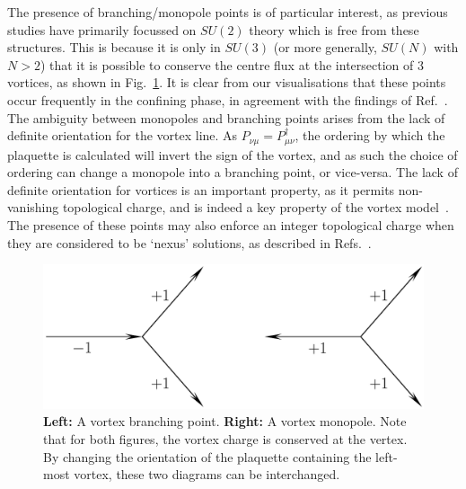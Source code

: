 The presence of branching/monopole points is of particular interest, as previous studies have primarily focussed on $SU(2)$ theory which is free from these structures. This is because it is only in $SU(3)$ (or more generally, $SU(N)$ with $N>2$) that it is possible to conserve the centre flux at the intersection of 3 vortices, as shown in Fig.~\ref{fig:VortexBranching}. It is clear from our visualisations that these points occur frequently in the confining phase, in agreement with the findings of Ref.~\cite{Spengler:2018dxt}. The ambiguity between monopoles and branching points arises from the lack of definite orientation for the vortex line. As $P_{\nu\mu} = P_{\mu\nu}^\dagger$, the ordering by which the plaquette is calculated will invert the sign of the vortex, and as such the choice of ordering can change a monopole into a branching point, or vice-versa. The lack of definite orientation for vortices is an important property, as it permits non-vanishing topological charge, and is indeed a key property of the vortex model~\cite{Engelhardt:2010ft,Engelhardt:1999xw}. The presence of these points may also enforce an integer topological charge when they are considered to be `nexus' solutions, as described in Refs.~\cite{Cornwall:1999xw,Cornwall:1998ef}.
%
\begin{figure}[htb!]
\centering
\includegraphics[width=\linewidth]{./VortexBranching.pdf}
\caption{\label{fig:VortexBranching}\textbf{Left:} A vortex branching point. \textbf{Right:} A vortex monopole. Note that for both figures, the vortex charge is conserved at the vertex. By changing the orientation of the plaquette containing the left-most vortex, these two diagrams can be interchanged.}
\end{figure}
%
